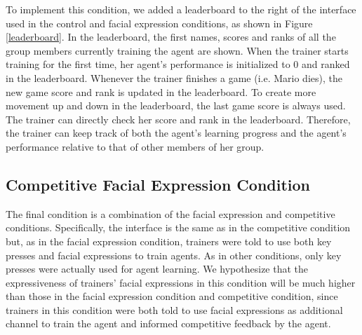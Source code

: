 \documentclass[10pt,journal,compsoc]{IEEEtran}
\begin{document}
To implement this condition, we added a leaderboard to the right of the interface used in the control and facial expression conditions, as shown in Figure \ref{leaderboard}. 
In the leaderboard, the first names, scores and ranks of all the group members currently training the agent are shown. When the trainer starts training for the first time, her agent's performance is initialized to 0 and ranked in the leaderboard. Whenever the trainer finishes a game (i.e. Mario dies), the new game score and rank is updated in the leaderboard. To create more movement up and down in the leaderboard, the last game score is always used. The trainer can directly check her score and rank in the leaderboard. Therefore, the trainer can keep track of both the agent's learning progress and the agent's performance relative to that of other members of her group.


\subsection{Competitive Facial Expression Condition}%
The final condition is a combination of the facial expression and competitive conditions. Specifically, the interface is the same as in the competitive condition but, as in the facial expression condition, trainers were told to use both key presses and facial expressions to train agents.  As in other conditions, only key presses were actually used for agent learning. We hypothesize that the expressiveness of trainers' facial expressions in this condition will be much higher than those in the facial expression condition and competitive condition, since trainers in this condition were both told to use facial expressions as additional channel to train the agent and informed competitive feedback by the agent.

\end{document}
